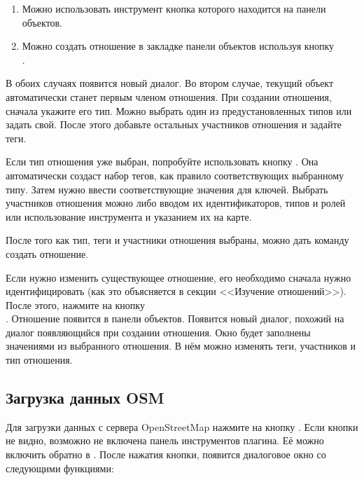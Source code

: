 \begin{enumerate}
\item Можно использовать инструмент
 кнопка которого
находится на панели объектов.
\item Можно создать отношение в закладке  панели объектов
используя кнопку \\
.
\end{enumerate}

В обоих случаях появится новый диалог. Во втором случае, текущий объект
автоматически станет первым членом отношения. При создании отношения,
сначала укажите его тип. Можно выбрать один из предустановленных типов
или задать свой. После этого добавьте остальных участников отношения
и задайте теги.

Если тип отношения уже выбран, попробуйте использовать кнопку
. Она автоматически
создаст набор тегов, как правило соответствующих выбранному типу. Затем
нужно ввести соответствующие значения для ключей. Выбрать участников
отношения можно либо вводом их идентификаторов, типов и ролей или
использование инструмента 
и указанием их на карте.

После того как тип, теги и участники отношения выбраны, можно дать
команду создать отношение.


Если нужно изменить существующее отношение, его необходимо сначала нужно
идентифицировать (как это объясняется в секции <<Изучение отношений>>).
После этого, нажмите на кнопку \\
. Отношение
появится в панели объектов. Появится новый диалог, похожий на диалог
появляющийся при создании отношения. Окно будет заполнены значениями из
выбранного отношения. В нём можно изменять теги, участников и тип
отношения.

\subsection{Загрузка данных OSM}

Для загрузки данных с сервера OpenStreetMap нажмите на кнопку
. Если кнопки не видно,
возможно не включена панель инструментов плагина. Её можно включить
обратно в  \arrow {} \arrow
{}.
После нажатия кнопки, появится диалоговое окно со следующими функциями:

